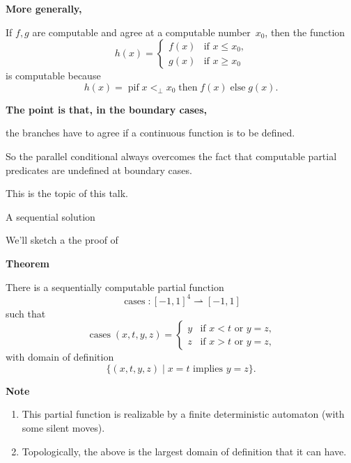 \documentclass{csslides-1.1}
\newcommand{\Cases}{\operatorname{cases}}
\newcommand{\parrow}{\rightharpoonup}
\begin{document}
\begin{slide}{}

{\bf More generally,}

If $f,g$ are computable and agree at a computable number~$x_0$, then
the function
\[
h(x) = \begin{cases}
                    f(x) & \text{if $x \leqslant x_0$,} \\
                    g(x) & \text{if $x \geqslant x_0$} 
                    \end{cases}
\]
is computable because
\[
h(x) = \operatorname{pif} x <_{\bot} x_0 \operatorname{then} f(x)
\operatorname{else} g(x).
\]

{\bf The point is that, in the boundary cases,}

the branches have to agree if a continuous function is to be defined.

So the parallel conditional always overcomes the fact that computable
partial predicates are undefined at boundary cases.

\vfill

This is the topic of this talk. 

\vfill

\end{slide}

\begin{slide}{A sequential solution}

We'll sketch a the proof of

\vfill

{\bf Theorem} 

\begin{it}
There is a sequentially computable partial function
\[
\Cases:[-1,1]^4 \parrow [-1,1]
\]
 such that
\[
\Cases(x,t,y,z) = \begin{cases}
                    y & \text{if $x < t$ or $y=z$,} \\
                    z & \text{if $x > t$ or $y=z$,}
                    \end{cases}
\]
with domain of definition
\[
\{ (x,t,y,z) \mid \text{$x = t$ implies $y=z$} \}. 
\]
\end{it}

\begin{small}
{\bf Note} \begin{enumerate}
\item This partial function is realizable by a finite deterministic
  automaton (with some silent moves).
\item Topologically, the above is the largest domain of definition
that it can have.
\end{enumerate}
\end{small}
\end{slide}
\end{document}
